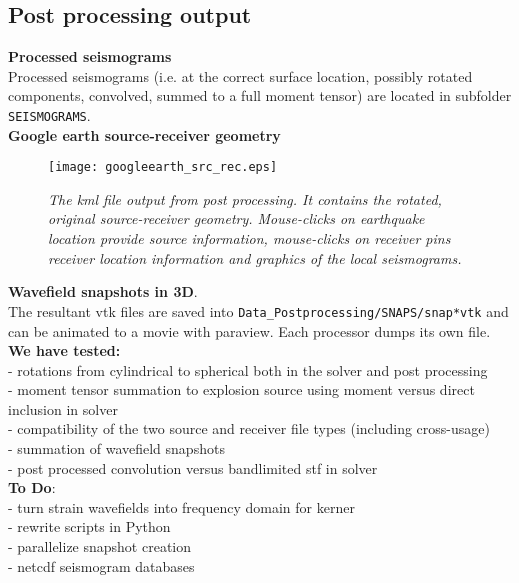\documentclass[11pt,letter,fleqn,english,notitlepage]{article}
\begin{document}
\subsection{Post processing output}

\noindent \textbf{Processed seismograms}\\
Processed seismograms (i.e. at the correct surface location, possibly rotated components, convolved, summed to a full 
moment tensor) are located in subfolder {\tt SEISMOGRAMS}.\\

\noindent \textbf{Google earth source-receiver geometry}\\
\begin{figure*}[htb]
\begin{center}
\texttt{[image: googleearth\_src\_rec.eps]}
\caption{\textit{The kml file output from post processing. It contains the rotated, original source-receiver geometry. Mouse-clicks 
on earthquake location provide source information, mouse-clicks on receiver pins receiver location information and graphics 
of the local seismograms.}}
\end{center}
\end{figure*}

\noindent \textbf{Wavefield snapshots in 3D}.\\
The resultant vtk files are saved into {\tt Data\_Postprocessing/SNAPS/snap*vtk} and can be animated to a movie 
with paraview. Each processor dumps its own file.\\

\noindent \textbf{We have tested:}\\
- rotations from cylindrical to spherical both in the solver and post processing\\
- moment tensor summation to explosion source using moment versus direct inclusion in solver\\
-  compatibility of the two source and receiver file types (including cross-usage)\\
- summation of wavefield snapshots\\
- post processed convolution versus bandlimited stf in solver\\

\noindent \textbf{To Do}:\\
- turn strain wavefields into frequency domain for kerner\\
- rewrite scripts in Python\\
- parallelize snapshot creation\\
- netcdf seismogram databases
\end{document}
